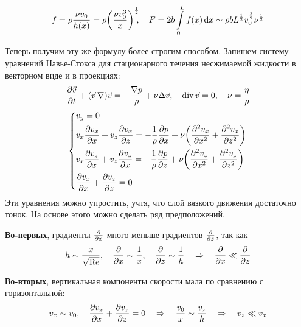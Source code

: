 \begin{equation}
	f=\rho \frac{\nu v_0}{h(x)}=\rho \qty(\frac{\nu v_0^3}{x})^{\frac12}\!\!, \quad
	F=2b \int\limits_0^L f(x) \dd{x} \sim \rho b L^{\frac12} v_0^{\frac32} \nu^{\frac12}
\end{equation}

Теперь получим эту же формулу более строгим способом. 
Запишем систему уравнений Навье-Стокса для стационарного течения 
несжимаемой жидкости в векторном виде и в проекциях:
\begin{equation}
    \pdv{\vec{v}}{t}+ (\vec{v}\,\nabla)\vec{v} = 
        -\frac{\nabla p}{\rho} + \nu \Delta \vec{v}, \quad
        \operatorname{div} \vec{v} = 0, \quad \nu = \frac{\eta}{\rho}
\end{equation}
\begin{equation}
	\label{eq:sys}
    \left\{\begin{aligned}
        &v_y=0\\
        &v_x \pdv{v_x}{x} + v_z \pdv{v_x}{z} = 
            -\frac{1}{\rho} \pdv{p}{x} + 
            \nu\qty(\pdv[2]{v_x}{x}+\pdv[2]{v_x}{z})\\
        &v_x\pdv{v_z}{x}+v_z\pdv{v_z}{x}=
            -\frac{1}{\rho}\pdv{p}{z}+
            \nu\qty(\pdv[2]{v_z}{x}+\pdv[2]{v_z}{z})\\
        &\pdv{v_x}{x}+\pdv{v_z}{z}=0
	\end{aligned}\right.
\end{equation}
Эти уравнения можно упростить, учтя, что слой вязкого движения 
достаточно тонок. На основе этого можно сделать ряд предположений.

\textbf{Во-первых},  градиенты $\pdv{x}$ много меньше градиентов
$\pdv{z}$, так как
\begin{equation}
    h\sim \frac{x}{\sqrt{\Re}}, \quad \pdv{x}\sim \frac{1}{x},
    \quad \pdv{z} \sim \frac{1}{h} 
    \quad\Rightarrow\quad 
    \pdv{x} \ll \pdv{z}
\end{equation}

\textbf{Во-вторых}, вертикальная компоненты скорости мала по сравнению с горизонтальной:
\begin{equation}
    v_x \sim v_0, \quad \pdv{v_x}{x}+\pdv{v_z}{z}=0 
    \quad\Rightarrow\quad 
    \frac{v_0}{x}\sim \frac{v_z}{h} 
    \quad\Rightarrow\quad 
    v_z \ll v_x
\end{equation}

